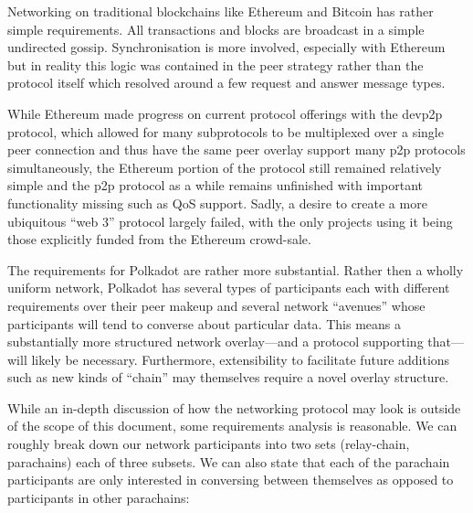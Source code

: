 \documentclass[9pt,oneside]{amsart}
\begin{document}
\begin{multicols}{2}
 Networking on traditional blockchains like Ethereum and Bitcoin has rather simple requirements. All transactions and blocks are broadcast in a simple undirected gossip. Synchronisation is more involved, especially with Ethereum but in reality this logic was contained in the peer strategy rather than the protocol itself which resolved around a few request and answer message types.

 While Ethereum made progress on current protocol offerings with the devp2p protocol, which allowed for many subprotocols to be multiplexed over a single peer connection and thus have the same peer overlay support many p2p protocols simultaneously, the Ethereum portion of the protocol still remained relatively simple and the p2p protocol as a while remains unfinished with important functionality missing such as QoS support. Sadly, a desire to create a more ubiquitous ``web 3'' protocol largely failed, with the only projects using it being those explicitly funded from the Ethereum crowd-sale.

 The requirements for Polkadot are rather more substantial. Rather then a wholly uniform network, Polkadot has several types of participants each with different requirements over their peer makeup and several network ``avenues'' whose participants will tend to converse about particular data. This means a substantially more structured network overlay---and a protocol supporting that---will likely be necessary. Furthermore, extensibility to facilitate future additions such as new kinds of ``chain'' may themselves require a novel overlay structure.

 While an in-depth discussion of how the networking protocol may look is outside of the scope of this document, some requirements analysis is reasonable. We can roughly break down our network participants into two sets (relay-chain, parachains) each of three subsets. We can also state that each of the parachain participants are only interested in conversing between themselves as opposed to participants in other parachains:



\end{multicols}
\end{document}
